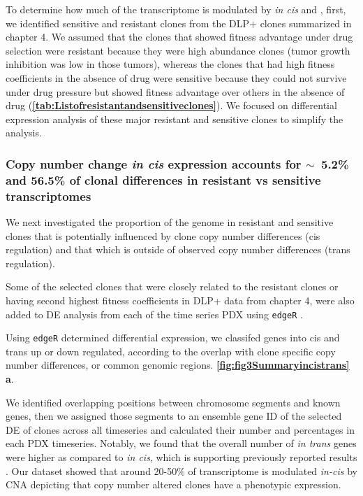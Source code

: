 To determine how much of the transcriptome is modulated by \textit{in cis} and , first, we identified sensitive and resistant clones from the DLP+ clones summarized in chapter 4. We assumed that the clones that showed fitness advantage under drug selection were resistant because they were high abundance clones (tumor growth inhibition was low in those tumors), whereas the clones that had high fitness coefficients in the absence of drug were sensitive because they could not survive under drug pressure but showed fitness advantage over others in the absence of drug (\textbf{\autoref{tab:Listofresistantandsensitiveclones}}). We focused on differential expression analysis of these major resistant and sensitive clones to simplify the analysis.

\subsubsection{Copy number change \textit{in cis} expression accounts for {$\sim${~}}5.2\% and 56.5\% of clonal differences in resistant vs sensitive transcriptomes}

We next investigated the proportion of the genome in resistant and sensitive clones that is potentially influenced by clone copy number differences (cis regulation) and that which is outside of observed copy number differences (trans regulation).

Some of the selected clones that were closely related to the resistant clones or having second highest fitness coefficients in DLP+ data from chapter 4, were also added to DE analysis from each of the time series PDX using \texttt{edgeR} \cite{robinson2010edger}. 

Using \texttt{edgeR} determined differential expression, we classifed genes into cis and trans up or down regulated, according to the overlap with clone specific copy number differences, or common genomic regions. \textbf{\autoref{fig:fig3Summaryincistrans} a}.

We identified overlapping positions between chromosome segments and known genes, then we assigned those segments to an ensemble gene ID \cite{rainer2019ensembldb} of the  selected \ac{DE} of clones across all timeseries and calculated their number and percentages in each PDX timeseries. Notably, we found that the overall number of \textit{in trans} genes were higher as compared to \textit{in cis}, which is supporting previously reported results \cite{shao2019copy}. Our dataset showed that around 20-50\% of transcriptome is modulated \textit{in-cis} by \ac{CNA} depicting that copy number altered clones have a phenotypic expression.

